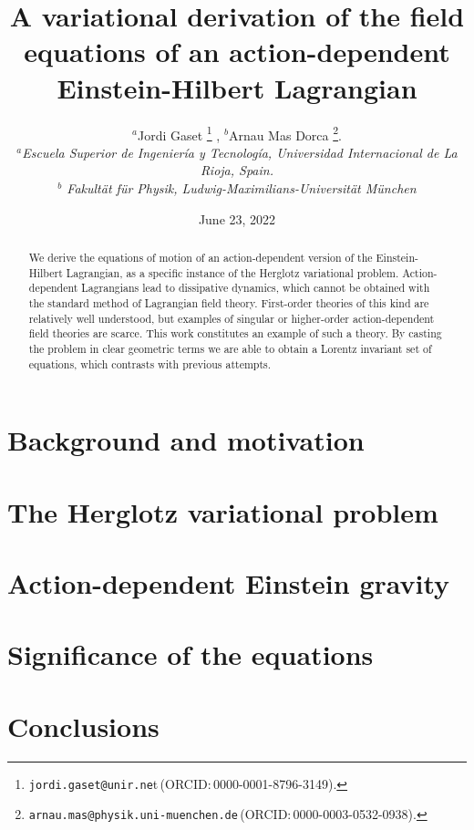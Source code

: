\documentclass[11pt,a4paper]{article}
\title{\sffamily \bfseries A variational derivation of the field equations of an action-dependent
	Einstein-Hilbert Lagrangian}
\author{\sffamily 
 $^a$Jordi Gaset
 \thanks{\texttt{jordi.gaset@unir.ne}t\,({ORCID}:\,0000-0001-8796-3149).} ,
$^b$Arnau Mas Dorca
\thanks{\texttt{arnau.mas@physik.uni-muenchen.de}\,({ORCID}:\,0000-0003-0532-0938).}.
\\[1ex]
\normalsize\itshape\sffamily 
$^a$Escuela Superior de Ingeniería y Tecnología, Universidad Internacional de La Rioja, Spain.
\\[1ex]
\normalsize\itshape\sffamily 
$^b$ Fakultät für Physik, Ludwig-Maximilians-Universität München
}
\date{\sffamily \small June 23, 2022}
\begin{document}
\maketitle


\begin{abstract}
We derive the equations of motion of an action-dependent version of the Einstein-Hilbert Lagrangian, as a specific instance of the Herglotz variational problem. Action-dependent Lagrangians lead to dissipative dynamics, which cannot be obtained with the standard method of Lagrangian field theory. First-order theories of this kind are relatively well understood, but examples of singular or higher-order action-dependent field theories are scarce. This work constitutes an example of such a theory. By casting the problem in clear geometric terms we are able to obtain a Lorentz invariant set of equations, which contrasts with previous attempts. 
\end{abstract}

\newpage
	{\small \sffamily \tableofcontents}
\newpage

\section{Background and motivation}


\section{The Herglotz variational problem}\label{ch:herglotz}


\section{Action-dependent Einstein gravity}\label{ch:einstein}


\section{Significance of the equations}\label{ch:significance}


\section{Conclusions}\label{ch:conclusions}



\printbibliography
\end{document}
